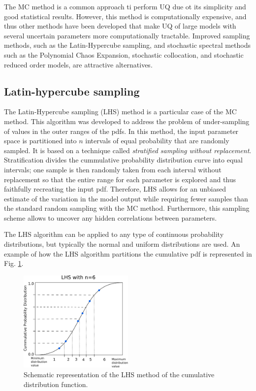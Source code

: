 \documentclass[12pt]{article}
\begin{document}
  The MC method is a common approach ti perform UQ due ot its simplicity and good statistical results. However, this method is computationally expensive, and thus other methods have been developed that make UQ of large models with several uncertain parameters more computationally tractable. Improved sampling methods, such as the Latin-Hypercube sampling, and stochastic spectral methods such as the Polynomial Chaos Expansion, stochastic collocation, and stochastic reduced order models, are attractive alternatives.

\subsection{Latin-hypercube sampling}

The Latin-Hypercube sampling (LHS) method is a particular case of the MC method. This algorithm was developed to address the problem of under-sampling of values in the outer ranges of the pdfs.  In this method, the input parameter space is partitioned into $n$ intervals of equal probability that are randomly sampled.  It is based on a technique called \textit{stratified sampling without replacement}. Stratification divides the cummulative probability distribution curve into equal intervals; one sample is then randomly taken from each interval without replacement  so that the entire range for each parameter is explored and  thus faithfully recreating the input pdf. Therefore, LHS allows for an unbiased estimate of the variation in the model output while requiring fewer samples than the standard random sampling with the MC method. Furthermore, this sampling scheme allows to uncover any hidden correlations between parameters.

The LHS algorithm can be applied to any type of continuous probability distributions, but typically the normal and uniform distributions are used. An example of how the LHS algorithm partitions the cumulative pdf is represented in Fig. \ref{fig:LHS}.

\vspace{0.5cm}
\begin{figure}[h]
	\centering
	\includegraphics[width=0.5\textwidth]{images/LHS.png}
	\caption{Schematic representation of the LHS method of the cumulative distribution function.}
	\label{fig:LHS}
\end{figure}
\end{document}
